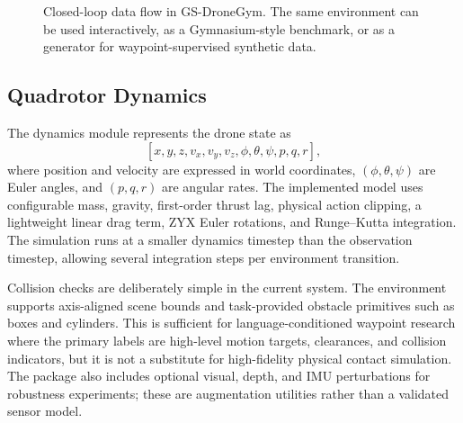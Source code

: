 \documentclass[11pt]{article}
\begin{document}
\begin{figure}[t]
\centering
{}
\caption{Closed-loop data flow in GS-DroneGym. The same environment can be used interactively, as a Gymnasium-style benchmark, or as a generator for waypoint-supervised synthetic data.}
\label{fig:pipeline}
\end{figure}

\subsection{Quadrotor Dynamics}

The dynamics module represents the drone state as
\[
[x,y,z,v_x,v_y,v_z,\phi,\theta,\psi,p,q,r],
\]
where position and velocity are expressed in world coordinates, $(\phi,\theta,\psi)$ are Euler angles, and $(p,q,r)$ are angular rates. The implemented model uses configurable mass, gravity, first-order thrust lag, physical action clipping, a lightweight linear drag term, ZYX Euler rotations, and Runge--Kutta integration. The simulation runs at a smaller dynamics timestep than the observation timestep, allowing several integration steps per environment transition.

Collision checks are deliberately simple in the current system. The environment supports axis-aligned scene bounds and task-provided obstacle primitives such as boxes and cylinders. This is sufficient for language-conditioned waypoint research where the primary labels are high-level motion targets, clearances, and collision indicators, but it is not a substitute for high-fidelity physical contact simulation. The package also includes optional visual, depth, and IMU perturbations for robustness experiments; these are augmentation utilities rather than a validated sensor model.
\end{document}
